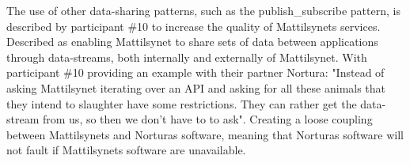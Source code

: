 The use of other data-sharing patterns, such as the \gls{publish_subscribe} pattern, is described by participant \#10 to increase the quality of Mattilsynets services. Described as enabling Mattilsynet to share sets of data between applications through data-streams, both internally and externally of Mattilsynet. With participant \#10 providing an example with their partner Nortura: "Instead of asking Mattilsynet iterating over an API and asking for all these animals that they intend to slaughter have some restrictions. They can rather get the data-stream from us, so then we don't have to to ask". Creating a loose coupling between Mattilsynets and Norturas software, meaning that Norturas software will not fault if Mattilsynets software are unavailable.




